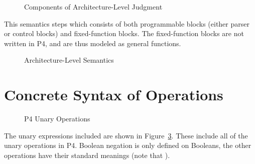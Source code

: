 \documentclass[UTF8]{article}
\begin{document}
\begin{figure}[h!]
\centering\ottgrammartabular{
\ottactx\ottinterrule
\ottaenv\ottafterlastrule
}
\caption{Components of Architecture-Level Judgment}
\label{fig:status}
\end{figure}


This semantics steps which consists of both programmable blocks (either parser or control blocks) and fixed-function blocks. The fixed-function blocks are not written in P4, and are thus modeled as general functions.

\begin{figure}[ht!]
\caption{Architecture-Level Semantics}
\label{fig:semarch}
\end{figure}

\printbibliography

\clearpage
\appendix
\section{Concrete Syntax of Operations}
\label{app:op}
\begin{figure}[ht!]
\centering\ottgrammartabular{
\ottunop\ottafterlastrule
}
\caption{P4 Unary Operations}
\label{fig:unop}
\end{figure}

The unary expressions included are shown in Figure~\ref{fig:unop}. These include all of the unary operations in P4. Boolean negation is only defined on Booleans, the other operations have their standard meanings (note that ).
\end{document}
